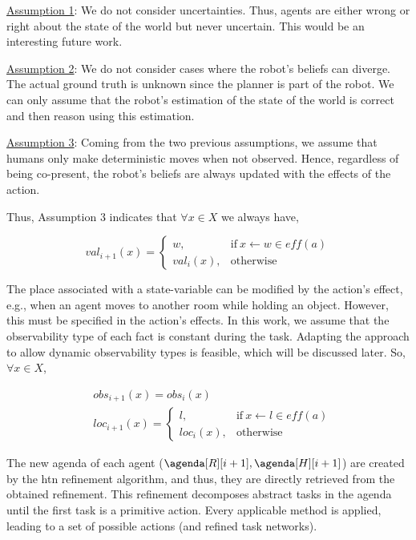 {\underline{Assumption 1}: We do not consider uncertainties. Thus, agents are either wrong or right about the state of the world but never uncertain. This would be an interesting future work. 

\underline{Assumption 2}: We do not consider cases where the robot's beliefs can diverge. The actual ground truth is unknown since the planner is part of the robot. We can only assume that the robot's estimation of the state of the world is correct and then reason using this estimation.

\underline{Assumption 3}: Coming from the two previous assumptions, we assume that humans only make deterministic moves when not observed. Hence, regardless of being co-present, the robot's beliefs are always updated with the effects of the action.



Thus, Assumption 3 indicates that $\forall x \in X$ we always have,

\begin{equation} \label{eq:apply_action_r}
    val_{i+1}(x) = \left\{ 
    \begin{array}{ll}
        w, & \mbox{if} ~ x \leftarrow w \in \textit{eff}(a)   \\ 
        val_i(x), & \mbox{otherwise}
    \end{array}\right.
\end{equation}

The place associated with a state-variable can be modified by the action's effect, e.g., when an agent moves to another room while holding an object. However, this must be specified in the action's effects. 
In this work, we assume that the observability type of each fact is constant during the task. Adapting the approach to allow dynamic observability types is feasible, which will be discussed later.
So, $\forall x \in X$,

\begin{align} \label{eq:obs_update}
    &obs_{i+1}(x) = obs_i(x) \\
    &loc_{i+1}(x) = \left\{ 
    \begin{array}{ll}
        l, & \mbox{if} ~ x \leftarrow l \in \textit{eff}(a)\\
        loc_i(x), & \mbox{otherwise}
    \end{array}\right.
\end{align}

The new agenda of each agent ($\agenda[R][i+1], \agenda[H][i+1]$) are created by the \acrshort{htn} refinement algorithm, and thus, they are directly retrieved from the obtained refinement. 
This refinement decomposes abstract tasks in the agenda until the first task is a primitive action. Every applicable method is applied, leading to a set of possible actions (and refined task networks).

}
